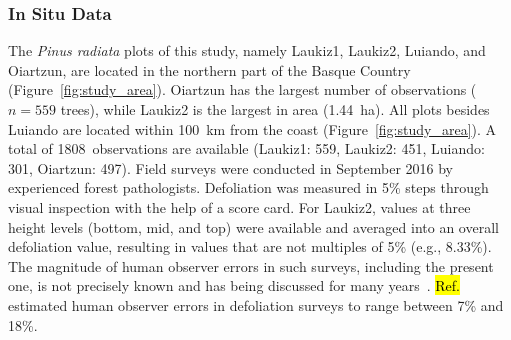\documentclass[remotesensing,article,accept,moreauthors,pdftex]{Definitions/mdpi}
\begin{document}
\subsubsection{In Situ Data}

The \textit{Pinus radiata} plots of this study, namely Laukiz1, Laukiz2, Luiando, and Oiartzun, are located in the northern part of the Basque Country (Figure~\ref{fig:study_area}).
Oiartzun has the largest number of observations ($n = 559$ trees), while Laukiz2 is the largest in area (1.44~ha).
All plots besides Luiando are located within 100~km from the coast (Figure~\ref{fig:study_area}).
A total of 1808~observations are available (Laukiz1: 559, Laukiz2: 451, Luiando: 301, Oiartzun: 497).
Field surveys were conducted in September 2016 by experienced forest pathologists.
Defoliation was measured in 5\% steps through visual inspection with the help of a score card.
For Laukiz2, values at three height levels (bottom, mid, and top) were available and averaged into an overall defoliation value, resulting in values that are not multiples of 5\% (e.g., 8.33\%).
The magnitude of human observer errors in such surveys, including the present one, is not precisely known and has being discussed for many years~\cite{innes1993}.
\hl{Ref.}%
~\cite{maclean1982} estimated human observer errors in defoliation surveys to range between 7\% and 18\%.
\end{document}
